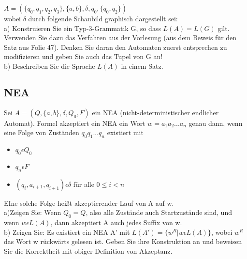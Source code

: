 \documentclass[paper=a4, fontsize=11pt]{scrartcl}
\numberwithin{equation}{section}
\numberwithin{figure}{section}
\numberwithin{table}{section}
\begin{document}
$A= ( \{ q_{0}, q_{1}, q_{2}, q_{3} \} , \{ a,b \} , \delta , q_{0}, \{ q_{0} , q_{2} \})$ \\

wobei $\delta$ durch folgende Schaubild graphisch dargestellt sei: \\

a) Konstruieren Sie ein Typ-3-Grammatik G, so dass $L(A) = L(G)$ gilt. Verwenden Sie dazu das Verfahren aus der Vorlesung (aus dem Beweis für den Satz aus Folie 47). Denken Sie daran den Automaten zuerst entsprechen zu modifizieren und geben Sie auch das Tupel von G an! \\

b) Beschreiben Sie die Sprache $L(A)$ in einem Satz. \\


\subsection{NEA}

Sei $A = (Q, \{ a,b \}, \delta , Q_{0} , F)$ ein NEA (nicht-deterministischer endlicher Automat). Formel akzeptiert ein NEA ein Wort $w=a_{1}a_{2}...a_{n}$ genau dann, wenn eine Folge von Zuständen $q_{0}q_{1}...q_{n}$ existiert mit \\

\begin{itemize}
\item $q_{0} \epsilon Q_{0}$
\item $q_{n} \epsilon F$
\item $(q_{i}, a_{i+1}, q_{i+1}) \epsilon \delta$ für alle $0 \leq i < n$
\end{itemize}  

EIne solche Folge heißt akzeptierender Lauf von A auf w. \\

a)Zeigen Sie: Wenn $Q_{0} = Q$, also alle Zustände auch Startzustände sind, und wenn $w \epsilon L(A)$, dann akzeptiert A auch jedes Suffix von w. \\

b) Zeigen Sie: Es existiert ein NEA A' mit $L(A') = \{ w^{R} | w \epsilon L(A) \}$, wobei $w^{R}$ das Wort w rückwärts gelesen ist. Geben Sie ihre Konstruktion an und beweisen Sie die Korrektheit mit obiger Definition von Akzeptanz. \\

\end{document}
